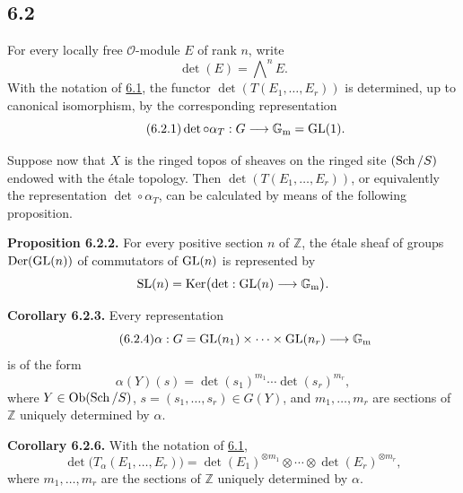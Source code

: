 \subsection*{6.2}
For every locally free $\mathcal O$-module $E$ of rank $n$, write
\[
\det(E)=\bigwedge\nolimits^n E.
\]
With the notation of \hyperlink{sga6.e10.sec.6.1}{6.1}, the functor $\det(T(E_1,\ldots,E_r))$ is
determined, up to canonical isomorphism, by the corresponding representation
\begin{equation}\tag{6.2.1}
\det\circ\alpha_T:G\longrightarrow\mathbb G_{\mathrm m}=\operatorname{GL}(1).
\end{equation}

Suppose now that $X$ is the ringed topos of sheaves on the ringed site
$(\operatorname{Sch}/S)$ endowed with the \'etale topology. Then
$\det(T(E_1,\ldots,E_r))$, or equivalently the representation
$\det\circ\alpha_T$, can be calculated by means of the following proposition.

\textbf{Proposition 6.2.2.}
For every positive section $n$ of $\mathbb Z$, the \'etale sheaf of groups
$\operatorname{Der}(\operatorname{GL}(n))$ of commutators of $\operatorname{GL}(n)$ is represented by
\[
\operatorname{SL}(n)=\operatorname{Ker}\bigl(\det:\operatorname{GL}(n)\longrightarrow\mathbb G_{\mathrm m}\bigr).
\]

\textbf{Corollary 6.2.3.}
Every representation
\begin{equation}\tag{6.2.4}
\alpha:G=\operatorname{GL}(n_1)\times\cdots\times\operatorname{GL}(n_r)\longrightarrow\mathbb G_{\mathrm m}
\end{equation}
is of the form
\begin{equation}\tag{6.2.5}
\alpha(Y)(s)=\det(s_1)^{m_1}\cdots\det(s_r)^{m_r},
\end{equation}
where $Y\in\operatorname{Ob}(\operatorname{Sch}/S)$, $s=(s_1,\ldots,s_r)\in G(Y)$, and
$m_1,\ldots,m_r$ are sections of $\mathbb Z$ uniquely determined by
$\alpha$.

\textbf{Corollary 6.2.6.}
With the notation of \hyperlink{sga6.e10.sec.6.1}{6.1},
\begin{equation}\tag{6.2.6}
\det\bigl(T_\alpha(E_1,\ldots,E_r)\bigr)
=\det(E_1)^{\otimes m_1}\otimes\cdots\otimes
\det(E_r)^{\otimes m_r},
\end{equation}
where $m_1,\ldots,m_r$ are the sections of $\mathbb Z$ uniquely determined
by $\alpha$.


